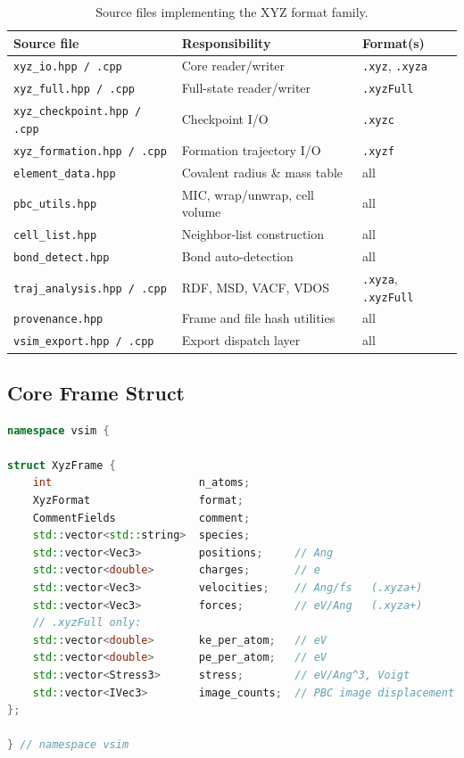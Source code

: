 \documentclass[11pt, a4paper, oneside]{article}
\begin{document}
\begin{table}[h]
\centering
\begin{tabular}{lll}
  \toprule
  Source file & Responsibility & Format(s) \\
  \midrule
  \texttt{xyz\_io.hpp / .cpp}         & Core reader/writer           & \texttt{.xyz}, \texttt{.xyza} \\
  \texttt{xyz\_full.hpp / .cpp}       & Full-state reader/writer     & \texttt{.xyzFull} \\
  \texttt{xyz\_checkpoint.hpp / .cpp} & Checkpoint I/O               & \texttt{.xyzc} \\
  \texttt{xyz\_formation.hpp / .cpp}  & Formation trajectory I/O     & \texttt{.xyzf} \\
  \texttt{element\_data.hpp}          & Covalent radius \& mass table & all \\
  \texttt{pbc\_utils.hpp}             & MIC, wrap/unwrap, cell volume & all \\
  \texttt{cell\_list.hpp}             & Neighbor-list construction    & all \\
  \texttt{bond\_detect.hpp}           & Bond auto-detection           & all \\
  \texttt{traj\_analysis.hpp / .cpp}  & RDF, MSD, VACF, VDOS          & \texttt{.xyza}, \texttt{.xyzFull} \\
  \texttt{provenance.hpp}             & Frame and file hash utilities  & all \\
  \texttt{vsim\_export.hpp / .cpp}    & Export dispatch layer         & all \\
  \bottomrule
\end{tabular}
\caption{Source files implementing the XYZ format family.}
\label{tab:impl}
\end{table}

\subsection{Core Frame Struct}

\begin{lstlisting}[language=C++, caption={Core frame struct (xyz\_io.hpp).}]
namespace vsim {

struct XyzFrame {
    int                       n_atoms;
    XyzFormat                 format;
    CommentFields             comment;
    std::vector<std::string>  species;
    std::vector<Vec3>         positions;     // Ang
    std::vector<double>       charges;       // e
    std::vector<Vec3>         velocities;    // Ang/fs   (.xyza+)
    std::vector<Vec3>         forces;        // eV/Ang   (.xyza+)
    // .xyzFull only:
    std::vector<double>       ke_per_atom;   // eV
    std::vector<double>       pe_per_atom;   // eV
    std::vector<Stress3>      stress;        // eV/Ang^3, Voigt
    std::vector<IVec3>        image_counts;  // PBC image displacement
};

} // namespace vsim
\end{lstlisting}
\end{document}

